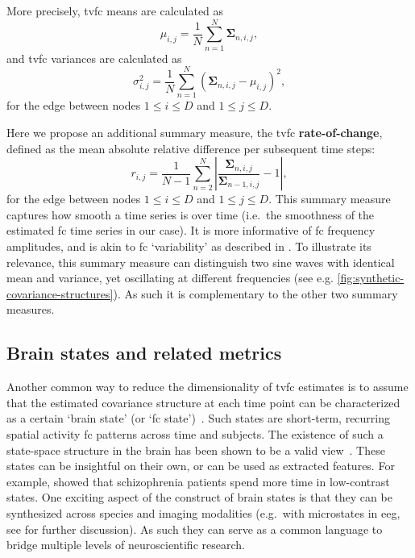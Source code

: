 More precisely, \gls{tvfc} means are calculated as
\begin{equation}
  \mu_{i,j} = \frac{1}{N} \sum_{n=1}^N \mathbf{\Sigma}_{n,i,j},
\end{equation}
and \gls{tvfc} variances are calculated as
\begin{equation}
  \sigma^2_{i,j} = \frac{1}{N} \sum_{n=1}^N (\mathbf{\Sigma}_{n,i,j} - \mu_{i,j})^2,
\end{equation}
for the edge between nodes $1 \leq i \leq D$ and $1 \leq j \leq D$.

Here we propose an additional summary measure, the \gls{tvfc} \textbf{rate-of-change}, defined as the mean absolute relative difference per subsequent time steps:
\begin{equation}
  r_{i,j} = \frac{1}{N-1} \sum_{n=2}^N | \frac{\mathbf{\Sigma}_{n,i,j}}{\mathbf{\Sigma}_{n-1,i,j}} - 1 |,
\end{equation}
for the edge between nodes $1 \leq i \leq D$ and $1 \leq j \leq D$.
This summary measure captures how smooth a time series is over time (i.e.~the smoothness of the estimated \gls{fc} time series in our case).
It is more informative of \gls{fc} frequency amplitudes, and is akin to \gls{fc} `variability' as described in \textcite{Allen2014}.
To illustrate its relevance, this summary measure can distinguish two sine waves with identical mean and variance, yet oscillating at different frequencies (see e.g. \cref{fig:synthetic-covariance-structures}).
As such it is complementary to the other two summary measures.

\subsection{Brain states and related metrics}
\label{subsec:brain-states}

Another common way to reduce the dimensionality of \gls{tvfc} estimates is to assume that the estimated covariance structure at each time point can be characterized as a certain `brain state' (or `\gls{fc} state')~\parencite{Kringelbach2020}.
Such states are short-term, recurring spatial activity \gls{fc} patterns across time and subjects.
%
The existence of such a state-space structure in the brain has been shown to be a valid view~\parencite{Deco2015}.
%
These states can be insightful on their own, or can be used as extracted features.
For example, \textcite{Rashid2016} showed that schizophrenia patients spend more time in low-contrast states.
One exciting aspect of the construct of brain states is that they can be synthesized across species and imaging modalities (e.g.~with microstates in \gls{eeg}, see \textcite{Allen2014} for further discussion).
As such they can serve as a common language to bridge multiple levels of neuroscientific research.

